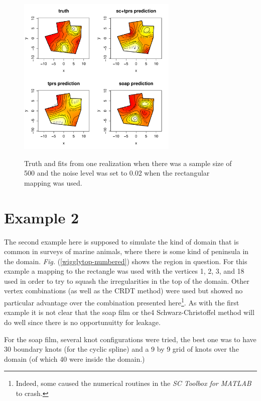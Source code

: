 \documentclass[a4paper,10pt]{amsart}
\newcommand{\sch}{Schwarz-Christoffel }
\newcommand{\Fig}[1]{\emph{Fig.} (\ref{#1})}
\begin{document}
\begin{figure}[tbp]
\centering
\includegraphics[width=3in]{figs-otherdomains/fig9-rect-real.pdf} \\
\caption{Truth and fits from one realization when there was a sample size of 500 and the noise level was set to 0.02 when the rectangular mapping was used. }
\label{fig9-rect-real}
\end{figure}




\section{Example 2}

The second example here is supposed to simulate the kind of domain that is common in surveys of marine animals, where there is some kind of peninsula in the domain. \Fig{wigglytop-numbered} shows the region in question. For this example a mapping to the rectangle was used with the vertices 1, 2, 3, and 18 used in order to try to squash the irregularities in the top of the domain. Other vertex combinations (as well as the CRDT method) were used but showed no particular advantage over the combination presented here\footnote{Indeed, some caused the numerical routines in the \emph{SC Toolbox for MATLAB} to crash.}. As with the first example it is not clear that the soap film or the4 \sch method will do well since there is no opportunuitty for leakage.

For the soap film, several knot configurations were tried, the best one was to have 30 boundary knots (for the cyclic spline) and a 9 by 9 grid of knots over the domain (of which 40 were inside the domain.) 
\end{document}
